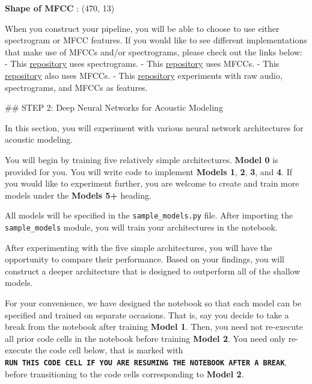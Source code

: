 \documentclass[11pt]{article}
\begin{document}
    \textbf{Shape of MFCC} : (470, 13)

    
    When you construct your pipeline, you will be able to choose to use
either spectrogram or MFCC features. If you would like to see different
implementations that make use of MFCCs and/or spectrograms, please check
out the links below: - This
\href{https://github.com/baidu-research/ba-dls-deepspeech}{repository}
uses spectrograms. - This
\href{https://github.com/mozilla/DeepSpeech}{repository} uses MFCCs. -
This
\href{https://github.com/buriburisuri/speech-to-text-wavenet}{repository}
also uses MFCCs. - This
\href{https://github.com/pannous/tensorflow-speech-recognition/blob/master/speech_data.py}{repository}
experiments with raw audio, spectrograms, and MFCCs as features.

     \#\# STEP 2: Deep Neural Networks for Acoustic Modeling

In this section, you will experiment with various neural network
architectures for acoustic modeling.

You will begin by training five relatively simple architectures.
\textbf{Model 0} is provided for you. You will write code to implement
\textbf{Models 1}, \textbf{2}, \textbf{3}, and \textbf{4}. If you would
like to experiment further, you are welcome to create and train more
models under the \textbf{Models 5+} heading.

All models will be specified in the \texttt{sample\_models.py} file.
After importing the \texttt{sample\_models} module, you will train your
architectures in the notebook.

After experimenting with the five simple architectures, you will have
the opportunity to compare their performance. Based on your findings,
you will construct a deeper architecture that is designed to outperform
all of the shallow models.

For your convenience, we have designed the notebook so that each model
can be specified and trained on separate occasions. That is, say you
decide to take a break from the notebook after training \textbf{Model
1}. Then, you need not re-execute all prior code cells in the notebook
before training \textbf{Model 2}. You need only re-execute the code cell
below, that is marked with
\textbf{\texttt{RUN\ THIS\ CODE\ CELL\ IF\ YOU\ ARE\ RESUMING\ THE\ NOTEBOOK\ AFTER\ A\ BREAK}},
before transitioning to the code cells corresponding to \textbf{Model
2}.
\end{document}
